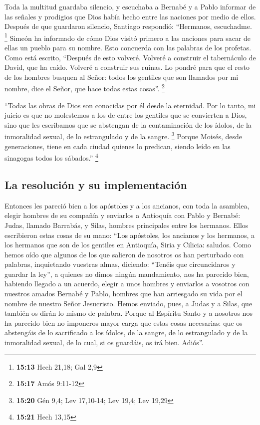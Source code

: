  Toda la multitud guardaba silencio, y escuchaba a
Bernabé y a Pablo informar de las señales y prodigios que Dios había
hecho entre las naciones por medio de ellos.  Después de
que guardaron silencio, Santiago respondió: ``Hermanos, escuchadme.
\footnote{\textbf{15:13} Hech 21,18; Gal 2,9}  Simeón ha
informado de cómo Dios visitó primero a las naciones para sacar de ellas
un pueblo para su nombre.  Esto concuerda con las
palabras de los profetas. Como está escrito,  ``Después
de esto volveré. Volveré a construir el tabernáculo de David, que ha
caído. Volveré a construir sus ruinas. Lo pondré  para
que el resto de los hombres busquen al Señor: todos los gentiles que son
llamados por mi nombre, dice el Señor, que hace todas estas cosas''.
\footnote{\textbf{15:17} Amós 9:11-12}

 ``Todas las obras de Dios son conocidas por él desde la
eternidad.  Por lo tanto, mi juicio es que no molestemos
a los de entre los gentiles que se convierten a Dios, 
sino que les escribamos que se abstengan de la contaminación de los
ídolos, de la inmoralidad sexual, de lo estrangulado y de la sangre.
\footnote{\textbf{15:20} Gén 9,4; Lev 17,10-14; Lev 19,4; Lev 19,29}
 Porque Moisés, desde generaciones, tiene en cada ciudad
quienes lo predican, siendo leído en las sinagogas todos los sábados.''
\footnote{\textbf{15:21} Hech 13,15}

\hypertarget{la-resoluciuxf3n-y-su-implementaciuxf3n}{%
\subsection{La resolución y su
implementación}\label{la-resoluciuxf3n-y-su-implementaciuxf3n}}

 Entonces les pareció bien a los apóstoles y a los
ancianos, con toda la asamblea, elegir hombres de su compañía y
enviarlos a Antioquía con Pablo y Bernabé: Judas, llamado Barrabás, y
Silas, hombres principales entre los hermanos.  Ellos
escribieron estas cosas de su mano: ``Los apóstoles, los ancianos y los
hermanos, a los hermanos que son de los gentiles en Antioquía, Siria y
Cilicia: saludos.  Como hemos oído que algunos de los que
salieron de nosotros os han perturbado con palabras, inquietando
vuestras almas, diciendo: ``Tenéis que circuncidaros y guardar la ley'',
a quienes no dimos ningún mandamiento,  nos ha parecido
bien, habiendo llegado a un acuerdo, elegir a unos hombres y enviarlos a
vosotros con nuestros amados Bernabé y Pablo,  hombres
que han arriesgado su vida por el nombre de nuestro Señor Jesucristo.
 Hemos enviado, pues, a Judas y a Silas, que también os
dirán lo mismo de palabra.  Porque al Espíritu Santo y a
nosotros nos ha parecido bien no imponeros mayor carga que estas cosas
necesarias:  que os abstengáis de lo sacrificado a los
ídolos, de la sangre, de lo estrangulado y de la inmoralidad sexual, de
lo cual, si os guardáis, os irá bien. Adiós''.

